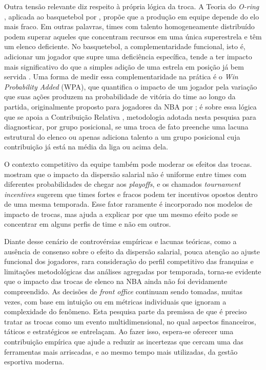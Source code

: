 Outra tensão relevante diz respeito à própria lógica da troca. A Teoria do \textit{O-ring} \citep{kremer1993}, aplicada ao basquetebol por \citet{ching2019}, propõe que a produção em equipe depende do elo mais fraco. Em outras palavras, times com talento homogeneamente distribuído podem superar aqueles que concentram recursos em uma única superestrela e têm um elenco deficiente. No basquetebol, a complementaridade funcional, isto é, adicionar um jogador que supre uma deficiência específica, tende a ter impacto mais significativo do que a simples adição de uma estrela em posição já bem servida \citep{oliver2004, kubatko2007}. Uma forma de medir essa complementaridade na prática é o \textit{Win Probability Added} (WPA), que quantifica o impacto de um jogador pela variação que suas ações produzem na probabilidade de vitória do time ao longo da partida, originalmente proposto para jogadores da NBA por \citet{deshpande2016}; é sobre essa lógica que se apoia a Contribuição Relativa \citep{sa2025}, metodologia adotada nesta pesquisa para diagnosticar, por grupo posicional, se uma troca de fato preenche uma lacuna estrutural do elenco ou apenas adiciona talento a um grupo posicional cuja contribuição já está na média da liga ou acima dela.

O contexto competitivo da equipe também pode moderar os efeitos das trocas. \citet{katayama2011} mostram que o impacto da dispersão salarial não é uniforme entre times com diferentes probabilidades de chegar aos \textit{playoffs}, e os chamados \textit{tournament incentives} \citep{taylor2002} sugerem que times fortes e fracos podem ter incentivos opostos dentro de uma mesma temporada. Esse fator raramente é incorporado nos modelos de impacto de trocas, mas ajuda a explicar por que um mesmo efeito pode se concentrar em alguns perfis de time e não em outros.

Diante desse cenário de controvérsias empíricas e lacunas teóricas, como a ausência de consenso sobre o efeito da dispersão salarial, pouca atenção ao ajuste funcional dos jogadores, rara consideração do perfil competitivo das franquias e limitações metodológicas das análises agregadas por temporada, torna-se evidente que o impacto das trocas de elenco na NBA ainda não foi devidamente compreendido. As decisões de \textit{front office} continuam sendo tomadas, muitas vezes, com base em intuição ou em métricas individuais que ignoram a complexidade do fenômeno. Esta pesquisa parte da premissa de que é preciso tratar as trocas como um evento multidimensional, no qual aspectos financeiros, táticos e estratégicos se entrelaçam. Ao fazer isso, espera-se oferecer uma contribuição empírica que ajude a reduzir as incertezas que cercam uma das ferramentas mais arriscadas, e ao mesmo tempo mais utilizadas, da gestão esportiva moderna.

